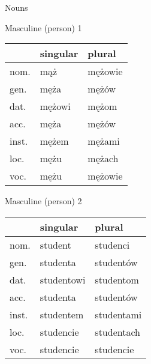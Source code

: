\documentclass[10pt,twoside]{../filofax2}
\begin{document}
	
\begin{ffpage}{\Huge Nouns}
	
Masculine (person) 1
\begin{tabular}{|m{1cm}||m{2.5cm}|m{2.5cm}|}
\hline
 &singular& plural\\ \hline
nom. & mąż& mężowie\\ \hline
gen.&męża &mężów\\ \hline
dat. & mężowi &mężom\\ \hline
acc.&męża&mężów \\ \hline
inst.& mężem&mężami\\ \hline
loc.&mężu&mężach\\ \hline
voc.&mężu&mężowie\\ \hline
\end{tabular}

\vspace{0.75cm}
Masculine (person) 2
\begin{tabular}{|m{1cm}||m{2.5cm}|m{2.5cm}|}
\hline
 &singular& plural\\ \hline
nom. & student&studenci \\ \hline
gen.&studenta& studentów\\ \hline
dat. &studentowi&studentom\\ \hline
acc.&studenta&studentów \\ \hline
inst.&studentem&studentami\\ \hline
loc.&studencie&studentach\\ \hline
voc.&studencie&studencie\\ \hline
\end{tabular}
\end{ffpage}
\end{document}
